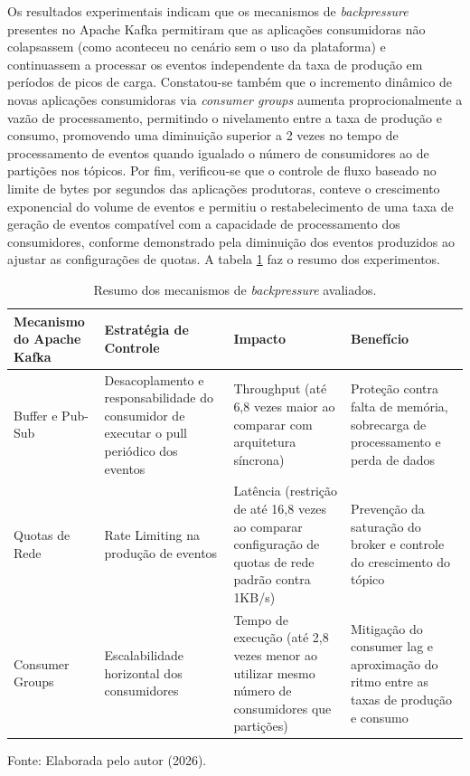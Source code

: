 \documentclass[12pt]{article}
\begin{document}
  Os resultados experimentais indicam que os mecanismos de \textit{backpressure} presentes no Apache Kafka permitiram que as aplicações consumidoras não colapsassem (como aconteceu no cenário sem o uso da plataforma) e continuassem a processar os eventos independente da taxa de produção em períodos de picos de carga. Constatou-se também que o incremento dinâmico de novas aplicações consumidoras via \textit{consumer groups} aumenta proprocionalmente a vazão de processamento, permitindo o nivelamento entre a taxa de produção e consumo, promovendo uma diminuição superior a 2 vezes no tempo de processamento de eventos quando igualado o número de consumidores ao de partições nos tópicos. Por fim, verificou-se que o controle de fluxo baseado no limite de bytes por segundos das aplicações produtoras, conteve o crescimento exponencial do volume de eventos e permitiu o restabelecimento de uma taxa de geração de eventos compatível com a capacidade de processamento dos consumidores, conforme demonstrado pela diminuição dos eventos produzidos ao ajustar as configurações de quotas. A tabela \ref{tab:comparativo-mecanismos} faz o resumo dos experimentos.

  \begin{table}[htbp]
    \centering
    \caption{Resumo dos mecanismos de \textit{backpressure} avaliados.}
    \label{tab:comparativo-mecanismos}
    \vspace{4pt} %
    \begin{tabularx}{\textwidth}{@{} >{\raggedright\arraybackslash}p{2.8cm} >{\raggedright\arraybackslash}X >{\raggedright\arraybackslash}X >{\raggedright\arraybackslash}X @{}}
    \toprule
    \textbf{Mecanismo do Apache Kafka} & \textbf{Estratégia de Controle} & \textbf{Impacto} & \textbf{Benefício} \\ \midrule
    Buffer e Pub-Sub & Desacoplamento e responsabilidade do consumidor de executar o pull periódico dos eventos & Throughput (até 6,8 vezes maior ao comparar com arquitetura síncrona) & Proteção contra falta de memória, sobrecarga de processamento e perda de dados \\ \addlinespace
    Quotas de Rede & Rate Limiting na produção de eventos & Latência (restrição de até 16,8 vezes ao comparar configuração de quotas de rede padrão contra 1KB/s) & Prevenção da saturação do broker e controle do crescimento do tópico \\ \addlinespace
    Consumer Groups & Escalabilidade horizontal dos consumidores & Tempo de execução (até 2,8 vezes menor ao utilizar mesmo número de consumidores que partições) & Mitigação do consumer lag e aproximação do ritmo entre as taxas de produção e consumo\\ \bottomrule
    \end{tabularx}
    \vspace{4pt}

    \begin{minipage}{\textwidth}
      \footnotesize Fonte: Elaborada pelo autor (2026).
    \end{minipage}
  \end{table}
\end{document}
